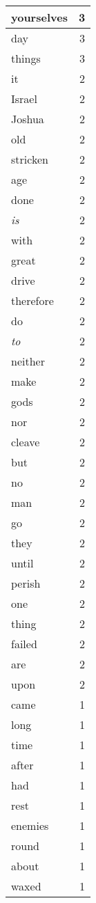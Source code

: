 \begin{center}
\begin{longtable}{l|r}
yourselves & 3\\ \hline 
day & 3\\ \hline 
things & 3\\ \hline 
it & 2\\ \hline 
Israel & 2\\ \hline 
Joshua & 2\\ \hline 
old & 2\\ \hline 
stricken & 2\\ \hline 
age & 2\\ \hline 
done & 2\\ \hline 
\emph{is} & 2\\ \hline 
with & 2\\ \hline 
great & 2\\ \hline 
drive & 2\\ \hline 
therefore & 2\\ \hline 
do & 2\\ \hline 
\emph{to} & 2\\ \hline 
neither & 2\\ \hline 
make & 2\\ \hline 
gods & 2\\ \hline 
nor & 2\\ \hline 
cleave & 2\\ \hline 
but & 2\\ \hline 
no & 2\\ \hline 
man & 2\\ \hline 
go & 2\\ \hline 
they & 2\\ \hline 
until & 2\\ \hline 
perish & 2\\ \hline 
one & 2\\ \hline 
thing & 2\\ \hline 
failed & 2\\ \hline 
are & 2\\ \hline 
upon & 2\\ \hline 
came & 1\\ \hline 
long & 1\\ \hline 
time & 1\\ \hline 
after & 1\\ \hline 
had & 1\\ \hline 
rest & 1\\ \hline 
enemies & 1\\ \hline 
round & 1\\ \hline 
about & 1\\ \hline 
waxed & 1\\ \hline 

\end{longtable}
\end{center}
